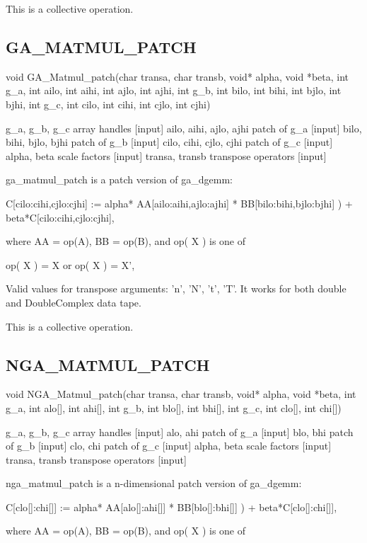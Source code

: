 This is a collective operation. 


\subsection*{GA\_MATMUL\_PATCH}

void GA\_Matmul\_patch(char transa, char transb, void{*} alpha, void
{*}beta, int g\_a, int ailo, int aihi, int ajlo, int ajhi, int g\_b,
int bilo, int bihi, int bjlo, int bjhi, int g\_c, int cilo, int cihi,
int cjlo, int cjhi)

g\_a, g\_b, g\_c array handles {[}input{]} ailo, aihi, ajlo, ajhi
patch of g\_a {[}input{]} bilo, bihi, bjlo, bjhi patch of g\_b {[}input{]}
cilo, cihi, cjlo, cjhi patch of g\_c {[}input{]} alpha, beta scale
factors {[}input{]} transa, transb transpose operators {[}input{]}

ga\_matmul\_patch is a patch version of ga\_dgemm:

C{[}cilo:cihi,cjlo:cjhi{]} := alpha{*} AA{[}ailo:aihi,ajlo:ajhi{]}
{*} BB{[}bilo:bihi,bjlo:bjhi{]} ) + beta{*}C{[}cilo:cihi,cjlo:cjhi{]},

where AA = op(A), BB = op(B), and op( X ) is one of

op( X ) = X or op( X ) = X',

Valid values for transpose arguments: 'n', 'N', 't', 'T'. It works
for both double and DoubleComplex data tape.

This is a collective operation. 


\subsection*{NGA\_MATMUL\_PATCH}

void NGA\_Matmul\_patch(char transa, char transb, void{*} alpha, void
{*}beta, int g\_a, int alo{[}{]}, int ahi{[}{]}, int g\_b, int blo{[}{]},
int bhi{[}{]}, int g\_c, int clo{[}{]}, int chi{[}{]})

g\_a, g\_b, g\_c array handles {[}input{]} alo, ahi patch of g\_a
{[}input{]} blo, bhi patch of g\_b {[}input{]} clo, chi patch of g\_c
{[}input{]} alpha, beta scale factors {[}input{]} transa, transb transpose
operators {[}input{]}

nga\_matmul\_patch is a n-dimensional patch version of ga\_dgemm:

C{[}clo{[}{]}:chi{[}{]}{]} := alpha{*} AA{[}alo{[}{]}:ahi{[}{]}{]}
{*} BB{[}blo{[}{]}:bhi{[}{]}{]} ) + beta{*}C{[}clo{[}{]}:chi{[}{]}{]},

where AA = op(A), BB = op(B), and op( X ) is one of

